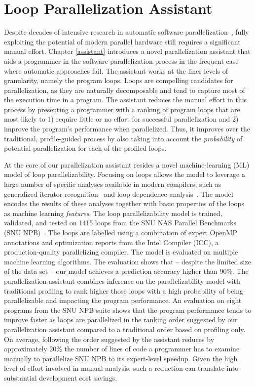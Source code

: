 \section{Loop Parallelization Assistant}
\label{introduction_assistant}
\quad Despite decades of intensive research in automatic software
parallelization~\cite{6813266}, fully exploiting the potential of modern parallel hardware still requires a significant manual effort. Chapter \ref{assistant} introduces a novel parallelization assistant that aids a programmer in the software parallelization process in the frequent case where automatic approaches fail. The assistant works at the finer levels of granularity, namely the program loops. Loops are compelling candidates for parallelization, as they are naturally decomposable and tend to capture most of the execution time in a program. The assistant reduces the manual effort in this process by presenting a programmer with a ranking of program loops that are most likely to 1) require little or no effort for successful parallelization and 2) improve the program's performance when parallelized. Thus, it improves over the traditional, profile-guided process by also taking into account the \emph{probability} of potential parallelization for each of the profiled loops.

At the core of our parallelization assistant resides a novel machine-learning (ML) model of loop parallelizability. Focusing on loops allows the model to leverage a large number of specific analyses available in modern compilers, such as generalized iterator recognition~\cite{Manilov:2018:GPI:3178372.3179511} and loop dependence analysis~\cite{Jensen:2017:ILD:3132652.3095754}. The model encodes the results of these analyses together with basic properties of the loops as machine learning \textit{features}. The loop parallelizability model is trained, validated, and tested on 1415 loops from the SNU NAS Parallel Benchmarks (SNU NPB)~\cite{Seo:2011:PCN:2357490.2358063}. The loops are labelled using a combination of expert OpenMP~\cite{Dagum:1998:OIA:615255.615542} annotations and optimization reports from the Intel \cpp{} Compiler (ICC), a
production-quality parallelizing compiler. The model is evaluated on multiple machine learning algorithms. The evaluation shows that -- despite the limited size of the data set -- our model achieves a prediction accuracy higher than 90\%.\newline\null
\quad The parallelization assistant combines inference on the parallelizability model with traditional profiling to rank higher those loops with a high probability of being parallelizable and impacting the program performance. An evaluation on eight programs from the SNU NPB suite shows that the program performance tends to improve faster as loops are parallelized in the ranking order suggested by our parallelization assistant compared to a traditional order based on profiling only. On average, following the order suggested by the assistant reduces by approximately 20\% the number of lines of code a programmer has to examine manually to parallelize SNU NPB to its expert-level speedup. Given the high level of effort involved in manual analysis, such a reduction can translate into substantial development cost savings.

